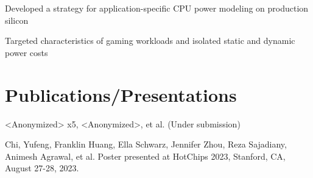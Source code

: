\documentclass[]{deedy-resume-openfont}
\begin{document}
\begin{minipage}[t]{0.64\textwidth}
\vspace{\topsep}
{\normalsize
\begin{tightemize}
\item Developed a strategy for application-specific CPU power modeling on production silicon
\item Targeted characteristics of gaming workloads and isolated static and dynamic power costs
\end{tightemize}
}
\smallsectionsep


\section{Publications/Presentations}
\vspace{\topsep}
\begin{tightemize}
\item <Anonymized> x5, <Anonymized>, et al.  (Under submission)
\item Chi, Yufeng, Franklin Huang, Ella Schwarz, Jennifer Zhou, Reza Sajadiany, Animesh Agrawal, et al. \href{https://hc2023.hotchips.org/assets/program/posters/HC2023.UCBerkeley.YufengChi.Poster.v06.pdf} {} Poster presented at HotChips 2023, Stanford, CA, August 27-28, 2023.
\end{tightemize}
\end{minipage} 
\end{document}
